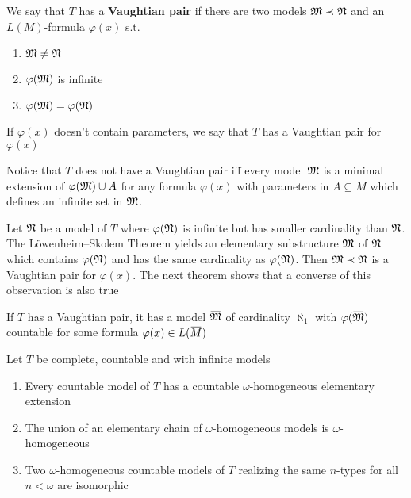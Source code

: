 \documentclass[11pt]{article}
\begin{document}
\begin{definition}[]
We say that \(T\) has a \textbf{Vaughtian pair} if there are two models \(\mathfrak{M}\prec\mathfrak{N}\) and
an \(L(M)\)-formula \(\varphi(x)\) s.t.
\begin{enumerate}
\item \(\mathfrak{M}\neq\mathfrak{N}\)
\item \(\varphi(\mathfrak{M})\) is infinite
\item \(\varphi(\mathfrak{M})=\varphi(\mathfrak{N})\)
\end{enumerate}


If \(\varphi(x)\) doesn't contain parameters, we say that \(T\) has a Vaughtian pair for \(\varphi(x)\)
\end{definition}

\begin{remark}
Notice that \(T\) does not have a Vaughtian pair iff every model \(\mathfrak{M}\) is a minimal extension
of \(\varphi(\mathfrak{M})\cup A\) for any formula \(\varphi(x)\) with parameters in \(A\subseteq M\) which defines an infinite
set in \(\mathfrak{M}\).
\end{remark}

Let \(\mathfrak{N}\) be a model of \(T\) where \(\varphi(\mathfrak{N})\) is infinite but has smaller cardinality than \(\mathfrak{N}\).
The Löwenheim–Skolem Theorem yields an elementary substructure \(\mathfrak{M}\) of \(\mathfrak{N}\) which
contains \(\varphi(\mathfrak{N})\) and has the same cardinality as \(\varphi(\mathfrak{N})\). Then \(\mathfrak{M}\prec\mathfrak{N}\) is a Vaughtian pair
for \(\varphi(x)\). The next theorem shows that a converse of this observation is also true

\begin{theorem}
\label{thm5.5.2}
If \(T\) has a Vaughtian pair, it has a model \(\barfM\) of cardinality \(\aleph_1\)
with \(\varphi(\barfM)\) countable for some formula \(\varphi(x)\in L(\barM)\)
\end{theorem}

\begin{lemma}[]
\label{lemma5.5.3}
Let \(T\) be complete, countable and with infinite models
\begin{enumerate}
\item Every countable model of \(T\) has a countable \(\omega\)-homogeneous elementary extension
\item The union of an elementary chain of \(\omega\)-homogeneous models is \(\omega\)-homogeneous
\item Two \(\omega\)-homogeneous countable models of \(T\) realizing the same \(n\)-types for all \(n<\omega\)
are isomorphic
\end{enumerate}
\end{lemma}
\end{document}
